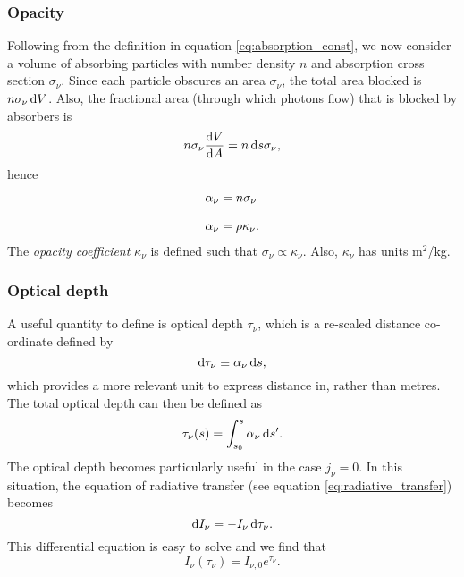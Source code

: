 \subsubsection{Opacity}
Following from the definition in equation \ref{eq:absorption_const}, we now consider a volume of absorbing particles with number density $n$ and absorption cross section $\sigma_\nu$.
 Since each particle obscures an area $\sigma_\nu$, the total area blocked is $n\sigma_\nu\mathop{}\!\mathrm{d} V$.
 Also, the fractional area (through which photons flow) that is blocked by absorbers is
$$ n \sigma_\nu \frac{\mathop{}\!\mathrm{d} V}{\mathop{}\!\mathrm{d} A} = n \mathop{}\!\mathrm{d} s \sigma_\nu, $$
hence
% 
\begin{align*}
	\alpha_\nu &= n \sigma_\nu	
	\linedrop
	\alpha_\nu &= \rho \kappa_\nu.
\end{align*}
%
The \emph{opacity coefficient} $\kappa_\nu$ is defined such that $\sigma_\nu \propto \kappa_\nu$. Also, $\kappa_\nu$ has units m$^2$/kg.
\par 
\subsubsection{Optical depth}
A useful quantity to define is optical depth $\tau_\nu$, which is a re-scaled distance co-ordinate defined by
$$ \mathop{}\!\mathrm{d} \tau_\nu \equiv \alpha_\nu \mathop{}\!\mathrm{d} s, $$
which provides a more relevant unit to express distance in, rather than metres.
 The total optical depth can then be defined as
$$ \tau_\nu (s) = \int_{s_0}^{s} \alpha_\nu \mathop{}\!\mathrm{d} s^\prime. $$
The optical depth becomes particularly useful in the case $j_\nu = 0$.
 In this situation, the equation of radiative transfer (see equation \ref{eq:radiative_transfer}) becomes
$$ \mathop{}\!\mathrm{d} I_\nu = - I_\nu \mathop{}\!\mathrm{d} \tau_\nu. $$
This differential equation is easy to solve and we find that
%
\begin{equation}
I_\nu (\tau_\nu) = I_{\nu,0} e^{\tau_\nu}.
\end{equation}
%
\par 
